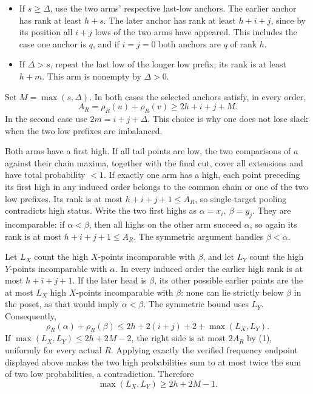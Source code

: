 \documentclass[
  11pt,
]{article}
\providecommand{\tightlist}{%
  \setlength{\itemsep}{0pt}\setlength{\parskip}{0pt}}
\begin{document}
\begin{itemize}
\tightlist
\item
  If \(s\ge\Delta\), use the two arms' respective last-low anchors. The
  earlier anchor has rank at least \(h+s\). The later anchor has rank at
  least \(h+i+j\), since by its position all \(i+j\) lows of the two
  arms have appeared. This includes the case one anchor is \(q\), and if
  \(i=j=0\) both anchors are \(q\) of rank \(h\).
\item
  If \(\Delta>s\), repeat the last low of the longer low prefix; its
  rank is at least \(h+m\). This arm is nonempty by \(\Delta>0\).
\end{itemize}

Set \(M=\max(s,\Delta)\). In both cases the selected anchors satisfy, in
every order, \[
 A_R=\rho_R(u)+\rho_R(v)\ge 2h+i+j+M.                 \tag{1}
\] In the second case use \(2m=i+j+\Delta\). This choice is why one does
not lose slack when the two low prefixes are imbalanced.

Both arms have a first high. If all tail points are low, the two
comparisons of \(a\) against their chain maxima, together with the final
cut, cover all extensions and have total probability \(<1\). If exactly
one arm has a high, each point preceding its first high in any induced
order belongs to the common chain or one of the two low prefixes. Its
rank is at most \(h+i+j+1\le A_R\), so single-target pooling contradicts
high status. Write the two first highs as \(\alpha=x_i,\ \beta=y_j\).
They are incomparable: if \(\alpha<\beta\), then all highs on the other
arm succeed \(\alpha\), so again its rank is at most \(h+i+j+1\le A_R\).
The symmetric argument handles \(\beta<\alpha\).

Let \(L_X\) count the high \(X\)-points incomparable with \(\beta\), and
let \(L_Y\) count the high \(Y\)-points incomparable with \(\alpha\). In
every induced order the earlier high rank is at most \(h+i+j+1\). If the
later head is \(\beta\), its other possible earlier points are the at most
\(L_X\) high \(X\)-points incomparable with \(\beta\): none can lie
strictly below \(\beta\) in the poset, as that would imply
\(\alpha<\beta\). The symmetric bound uses \(L_Y\). Consequently, \[
 \rho_R(\alpha)+\rho_R(\beta)
 \le 2h+2(i+j)+2+\max(L_X,L_Y).
\] If \(\max(L_X,L_Y)\le2h+2M-2\), the right side is at most \(2A_R\) by
(1), uniformly for every actual \(R\). Applying exactly the verified
frequency endpoint displayed above makes the two high probabilities sum
to at most twice the sum of two low probabilities, a contradiction.
Therefore \[
 \max(L_X,L_Y)\ge2h+2M-1.                              \tag{2}
\]
\end{document}
